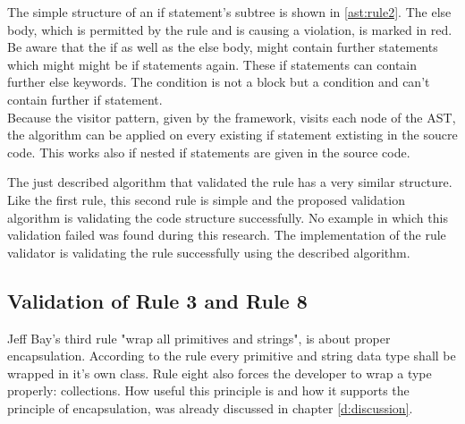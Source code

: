 The simple structure of an if statement's subtree is shown in \ref{ast:rule2}. The else body, which is permitted by the rule and is causing a violation, is marked in red. 
Be aware that the if as well as the else body, might contain further statements which might might be if statements again. These if statements can contain further else keywords. The condition is not a block but a condition and can't contain further if statement.
\\

Because the visitor pattern, given by the framework, visits each node of the \ac{AST}, the algorithm can be applied on every existing if statement extisting in the soucre code. This works also if nested if statements are given in the source code.
\\

\label{ast:rule2}

The just described algorithm that validated the rule has a very similar structure. Like the first rule, this second rule is simple and the proposed validation algorithm is validating the code structure successfully. No example in which this validation failed was found during this research. The implementation of the rule validator is validating the rule successfully using the described algorithm.

\subsection*{Validation of Rule 3 and Rule 8}
Jeff Bay's third rule "wrap all primitives and strings", is about proper encapsulation. According to the rule every primitive and string data type shall be wrapped in it's own class. Rule eight also forces the developer to wrap a type properly: collections. How useful this principle is and how it supports the principle of encapsulation, was already discussed in chapter \ref{d:discussion}.
\\

